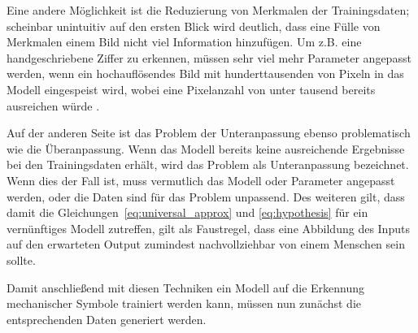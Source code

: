 Eine andere Möglichkeit ist die Reduzierung von Merkmalen der Trainingsdaten; scheinbar unintuitiv auf den ersten Blick wird deutlich, dass eine Fülle von Merkmalen einem Bild nicht viel Information hinzufügen. Um z.B. eine handgeschriebene Ziffer zu erkennen, müssen sehr viel mehr Parameter angepasst werden, wenn ein hochauflösendes Bild mit hunderttausenden von Pixeln in das Modell eingespeist wird, wobei eine Pixelanzahl von unter tausend bereits ausreichen würde \cite{Nielsen2015}.

Auf der anderen Seite ist das Problem der Unteranpassung ebenso problematisch wie die Überanpassung.
Wenn das Modell bereits keine ausreichende Ergebnisse bei den Trainingsdaten erhält, wird das Problem als Unteranpassung bezeichnet.
Wenn dies der Fall ist, muss vermutlich das Modell oder Parameter angepasst werden, oder die Daten sind für das Problem unpassend.
Des weiteren gilt, dass damit die Gleichungen~\eqref{eq:universal_approx} und \eqref{eq:hypothesis} für ein vernünftiges Modell zutreffen, gilt als Faustregel, dass eine Abbildung des Inputs auf den erwarteten Output zumindest nachvollziehbar von einem Menschen sein sollte.

Damit anschließend mit diesen Techniken ein Modell auf die Erkennung mechanischer Symbole trainiert werden kann, müssen nun zunächst die entsprechenden Daten generiert werden.
